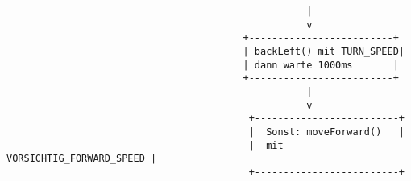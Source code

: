 \documentclass{vorlage-design-main}
\begin{document}
\begin{lstlisting}
                                                    |
                                                    v
                                         +-------------------------+
                                         | backLeft() mit TURN_SPEED|
                                         | dann warte 1000ms       |
                                         +-------------------------+
                                                    |
                                                    v
                                          +-------------------------+
                                          |  Sonst: moveForward()   |
                                          |  mit VORSICHTIG_FORWARD_SPEED |
                                          +-------------------------+
\end{lstlisting}

\newpage
\end{document}
